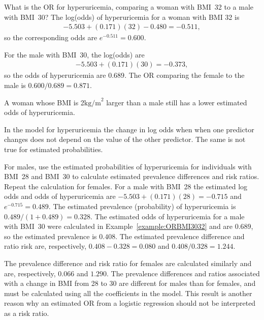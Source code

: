 \begin{examplewrap}
\begin{nexample}{What is the OR for hyperuricemia, comparing a woman with BMI~32 to a male with BMI~30?}
The log(odds) of hyperuricemia for a woman with BMI 32 is
\begin{align*}
   -5.503 + (0.171)(32) - 0.480 = -0.511,
\end{align*}
so the corresponding odds are $e^{-0.511} = 0.600$.

For the male with BMI~30, the log(odds) are
\begin{align*}
-5.503 + (0.171)(30) = -0.373,
\end{align*}
so the odds of hyperuricemia are $0.689$.
The OR comparing the female to the male is $0.600/0.689 = 0.871$.

A woman whose BMI is 2$\text{kg/m}^2$ larger than a male still has a lower estimated odds of hyperuricemia.
\label{example:ORBMI3032}
\end{nexample}
\end{examplewrap}

In the model for hyperuricemia the change in log odds when when one predictor changes does not depend on the value of the other predictor.  The same is not true for estimated probabilities.

\begin{examplewrap}
\begin{nexample}{For males, use the estimated probabilities of hyperuricemia for individuals with BMI~28 and BMI~30 to calculate estimated prevalence differences and risk ratios.  Repeat the calculation for females. }
For a male with BMI~28 the estimated log odds and odds of hyperuricemia are $-5.503 + (0.171)(28) = -0.715$ and  $e^{-0.715} = 0.489$.  The estimated prevalence (probability) of hyperuricemia is $0.489/(1 + 0.489) = 0.328$.  The estimated odds of hyperuricemia for a male with BMI~30 were calculated in Example~\ref{example:ORBMI3032} and are $0.689$, so the estimated prevalence is $0.408$.  The estimated prevalence difference and ratio risk are, respectively, $ 0.408 - 0.328 = 0.080$ and $ 0.408/0.328 = 1.244$.

The prevalence difference and risk ratio for females are calculated similarly and are, respectively, $0.066$ and $1.290$.  The prevalence differences and ratios associated with a change in BMI from 28 to 30 are different for males than for females, and must be calculated using all the coefficients in the model.  This result is another reason why an estimated OR from a logistic regression should not be interpreted as a risk ratio.

\label{example:probsDependOnOtherVars}
\end{nexample}
\end{examplewrap}

